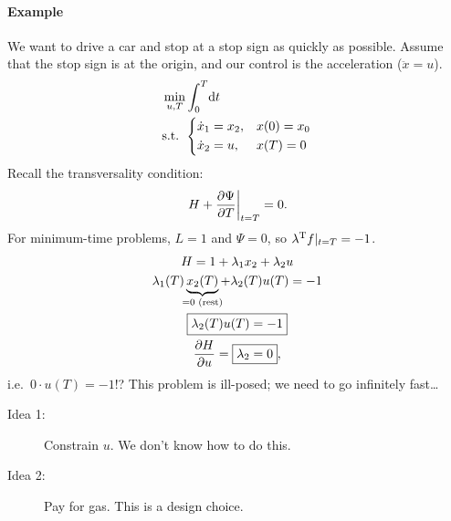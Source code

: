 \paragraph{Example} We want to drive a car and stop at a stop sign as quickly as possible. Assume that the stop sign is at the origin, and our control is the acceleration ($\ddot x=u$).
\begin{align}
  & \min_{u,T} \int_0^T \!\mathop{}\!\mathrm{d} t \\
  & \text{s.t. } \begin{dcases}
    \dot x_1 = x_2, & x(0) = x_0 \\
    \dot x_2 = u, & x(T) = 0
  \end{dcases}
\end{align}
Recall the transversality condition:
\begin{gather}
  \left. H + \frac{\partial \Psi}{\partial T} \right|_{t=T} = 0.
\end{gather}
For minimum-time problems, $L=1$ and $\Psi=0$, so $\lambda^\text{T} f|_{t=T} = -1$.
\begin{gather}
  H = 1 + \lambda_1 x_2 + \lambda_2 u \\
  \lambda_1(T) \underbrace{x_2(T)}_{\mathclap{=0 \text{ (rest)}}} + \lambda_2(T) u(T) = -1 \\
  \boxed{\lambda_2(T) u(T) = -1} \\
  \pder{H}{u} = \boxed{ \lambda_2 = 0 },
\end{gather}
i.e.\ $0\cdot u(T) = -1$!? This problem is ill-posed; we need to go infinitely fast\dots

\begin{description}
\item[Idea 1:] Constrain $u$. We don't know how to do this.
\item[Idea 2:] Pay for gas. This is a design choice.
\end{description}

